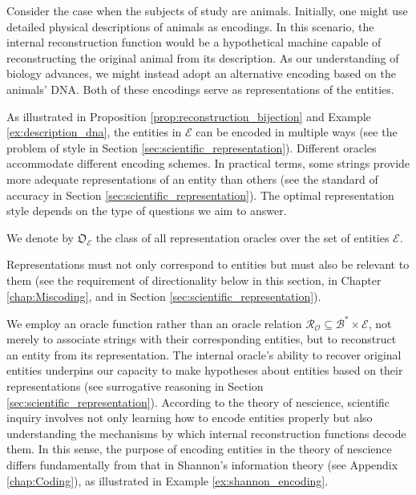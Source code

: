 \begin{example}
\label{ex:description_dna}
Consider the case when the subjects of study are animals. Initially, one might use detailed physical descriptions of animals as encodings. In this scenario, the internal reconstruction function would be a hypothetical machine capable of reconstructing the original animal from its description. As our understanding of biology advances, we might instead adopt an alternative encoding based on the animals' DNA. Both of these encodings serve as representations of the entities.
\end{example}

As illustrated in Proposition \ref{prop:reconstruction_bijection} and Example \ref{ex:description_dna}, the entities in $\mathcal{E}$ can be encoded in multiple ways (see the problem of style in Section \ref{sec:scientific_representation}). Different oracles accommodate different encoding schemes. In practical terms, some strings provide more adequate representations of an entity than others (see the standard of accuracy in Section \ref{sec:scientific_representation}). The optimal representation style depends on the type of questions we aim to answer.

\begin{notation}
We denote by $\mathfrak{O}_{\mathcal{E}}$ the class of all representation oracles over the set of entities $\mathcal{E}$.
\end{notation}

Representations must not only correspond to entities but must also be relevant to them (see the requirement of directionality below in this section, in Chapter \ref{chap:Miscoding}, and in Section \ref{sec:scientific_representation}).

We employ an oracle function rather than an oracle relation $\mathcal{R}_\mathcal{O} \subseteq \mathcal{B}^\ast \times \mathcal{E}$, not merely to associate strings with their corresponding entities, but to reconstruct an entity from its representation. The internal oracle's ability to recover original entities underpins our capacity to make hypotheses about entities based on their representations (see surrogative reasoning in Section \ref{sec:scientific_representation}). According to the theory of nescience, scientific inquiry involves not only learning how to encode entities properly but also understanding the mechanisms by which internal reconstruction functions decode them. In this sense, the purpose of encoding entities in the theory of nescience differs fundamentally from that in Shannon's information theory (see Appendix \ref{chap:Coding}), as illustrated in Example \ref{ex:shannon_encoding}.

